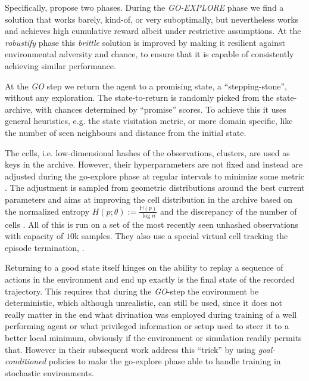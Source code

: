 \documentclass{article}
\begin{document}
Specifically, \citet{ecoffet_go-explore_2021} propose two phases.
% 
During the \emph{GO-EXPLORE} phase we find a solution that works barely, kind-of, or
very suboptimally, but nevertheless works and achieves high cumulative reward albeit
under restrictive assumptions.
% 
At the \emph{robustify} phase this \emph{brittle} solution is improved by making it
resilient against environmental adversity and chance, to ensure that it is capable of
consistently achieving similar performance.

At the \emph{GO} step we return the agent to a promising state, a ``stepping-stone'',
without any exploration.
%
The state-to-return is randomly picked from the state-archive, with chances determined
by ``promise'' scores. To achieve this it \citep[app.~A.5]{ecoffet_go-explore_2021} uses
general heuristics, e.g. the state visitation metric, or more domain specific, like the
number of seen neighbours and distance from the initial state.

The cells, i.e. low-dimensional hashes of the observations, clusters, are used as keys
in the archive. However, their hyperparameters are not fixed and instead are adjusted
during the go-explore phase at regular intervals to minimize some metric
\citep{ecoffet_first_2021}. The adjustment is sampled from geometric distributions
around the best current parameters and aims at improving the cell distribution in
the archive based on the normalized entropy $
    H(p; \theta)
        := \frac{\mathbb{H}(p)}{\log n}  %
$ and the discrepancy of the number of cells \citep[p.~15-16]{ecoffet_first_2021}. All
of this is run on a set of the most recently seen unhashed observations with capacity
of $10$k samples.
% 
They also use a special virtual cell tracking the episode termination,
\citep{ecoffet_first_2021}.

Returning to a good state itself hinges on the ability to replay a sequence of actions in
the environment and end up exactly is the final state of the recorded trajectory. This
requires that during the \emph{GO}-step the environment be deterministic, which although
unrealistic, can still be used, since it does not really matter in the end what divination
was employed during training of a well performing agent or what privileged information or
setup used to steer it to a better local minimum, obviously if the environment or simulation
readily permits that. However in their subsequent work \citep{ecoffet_first_2021} address
this ``trick'' by using \emph{goal-conditioned} policies to make the go-explore phase able
to handle training in stochastic environments.
\end{document}
